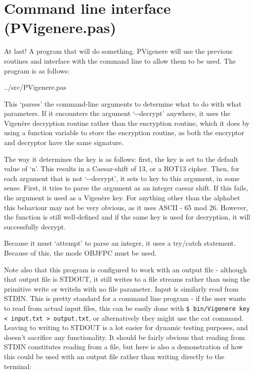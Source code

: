 \documentclass[fleqn,a4paper,11pt]{article}
\begin{document}
    \section{Command line interface (PVigenere.pas)}
    At last! A program that will do something. PVigenere will use the previous
    routines and interface with the command line to allow them to be used. The
    program is as follows:


{../src/PVigenere.pas}

    This `parses' the command-line arguments to determine what to do with what
    parameters. If it encounters the argument `-{}-decrypt' anywhere, it uses the
    Vigen\`ere decryption routine rather than the encryption routine, which it
    does by using a function variable to store the encryption routine, as both
    the encryptor and decryptor have the same signature.

    The way it determines the key is as follows: first, the key is set to the
    default value of `n'. This results in a Caesar-shift of 13, or a ROT13
    cipher. Then, for each argument that is not `-{}-decrypt', it sets to key to
    this argument, in some sense. First, it tries to parse the argument as an
    integer caesar shift. If this fails, the argument is used as a Vigen\`ere
    key. For anything other than the alphabet this behaviour may not be very
    obvious, as it uses ASCII - 65 mod 26. However, the function is still
    well-defined and if the same key is used for decryption, it will
    successfully decrypt.

    Because it must `attempt' to parse an integer, it uses a try/catch
    statement. Because of this, the mode OBJFPC must be used.

    Note also that this program is configured to work with an output file -
    although that output file is STDOUT, it still writes to a file streams
    rather than using the primitive write or writeln with no file parameter.
    Input is similarly read from STDIN. This is pretty standard for a command
    line program - if the user wants to read from actual input files, this can
    be easily done with \texttt{\$ bin/Vigenere key < input.txt > output.txt},
    or alternatively they might use the cat command. Leaving to writing to
    STDOUT is a lot easier for dynamic testing purposes, and doesn't sacrifice
    any functionality.  It should be fairly obvious that reading from STDIN
    constitutes reading from a file, but here is also a demonstration of how
    this could be used with an output file rather than writing directly to the
    terminal:
\end{document}
